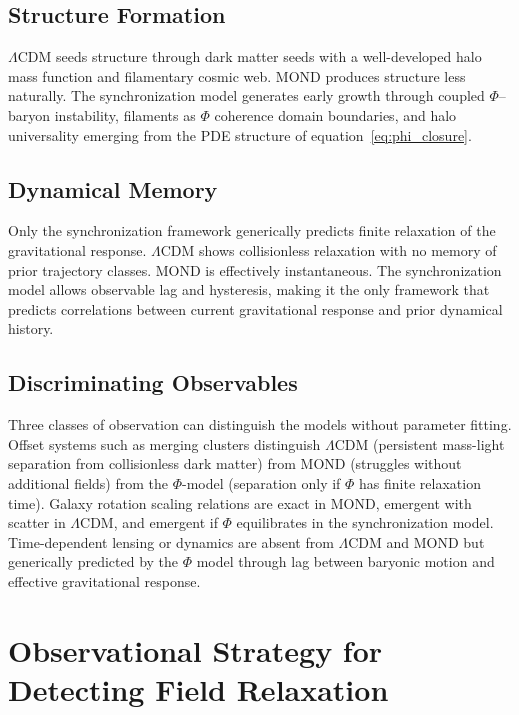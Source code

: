 \documentclass[11pt, a4paper, twocolumn]{article}
\begin{document}
\subsection{Structure Formation}

$\Lambda$CDM seeds structure through dark matter seeds with a well-developed
halo mass function and filamentary cosmic web. MOND produces structure less
naturally. The synchronization model generates early growth through coupled
$\Phi$--baryon instability, filaments as $\Phi$ coherence domain boundaries,
and halo universality emerging from the PDE structure of
equation~\eqref{eq:phi_closure}.

\subsection{Dynamical Memory}

Only the synchronization framework generically predicts finite relaxation of
the gravitational response. $\Lambda$CDM shows collisionless relaxation with
no memory of prior trajectory classes. MOND is effectively instantaneous.
The synchronization model allows observable lag and hysteresis, making it the
only framework that predicts correlations between current gravitational response
and prior dynamical history.

\subsection{Discriminating Observables}

Three classes of observation can distinguish the models without parameter
fitting. Offset systems such as merging clusters distinguish $\Lambda$CDM
(persistent mass-light separation from collisionless dark matter) from MOND
(struggles without additional fields) from the $\Phi$-model (separation only
if $\Phi$ has finite relaxation time). Galaxy rotation scaling relations are
exact in MOND, emergent with scatter in $\Lambda$CDM, and emergent if $\Phi$
equilibrates in the synchronization model. Time-dependent lensing or dynamics
are absent from $\Lambda$CDM and MOND but generically predicted by the $\Phi$
model through lag between baryonic motion and effective gravitational response.

\section{Observational Strategy for Detecting Field Relaxation}
\end{document}
